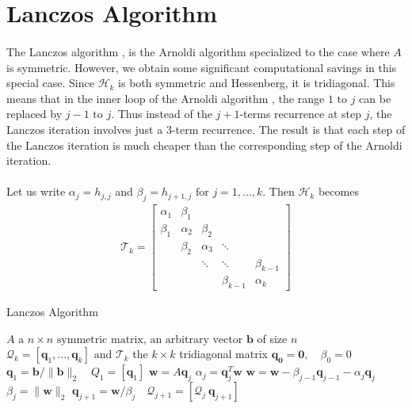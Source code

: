 \section{Lanczos Algorithm}
\paragraph*{}
The Lanczos algorithm \cite{Lanczos1950}, is the Arnoldi algorithm specialized to the case where $A$ is symmetric. However, we obtain some significant computational savings in this special case. Since $\mathcal{H}_k$ is both symmetric and Hessenberg, it is tridiagonal. This means that in the inner loop of the Arnoldi algorithm ,  the range $1 \text{ to } j$ can be replaced by $j-1 \text{ to } j$. Thus instead of the $j+1$-terms recurrence at step $j$, the Lanczos iteration involves just a $3$-term recurrence. The result is that each step of the Lanczos iteration is much cheaper than the corresponding step of the Arnoldi iteration.

\paragraph*{}
Let us write $\alpha_j=h_{j,j}$ and $\beta_j=h_{j+1,j} \text{ for } j=1,...,k$. Then $\mathcal{H}_k$ becomes
\begin{align*}
    \mathcal{T}_k = 
    \begin{bmatrix}
    \alpha_1    & \beta_1   &           &               &                \\
    \beta_1     & \alpha_2  & \beta_2   &               &                \\
                & \beta_2   & \alpha_3  & \ddots        &                \\
                &           & \ddots    & \ddots        & \beta_{k-1}   \\
                &           &           & \beta_{k-1}   & \alpha_{k}
  \end{bmatrix}
\end{align*} 

\begin{algorithm}
\caption{Lanczos Algorithm}\label{alg:lanczos}
\begin{algorithmic}[1]
\Require $A \text{ a } n\times n \text{ symmetric matrix, an arbitrary vector } \mathbf{b}$ of size $n$
\Ensure $ \mathcal{Q}_k=[\mathbf{q}_1,...,\mathbf{q}_k] \text{ and } \mathcal{T}_k$ the $k\times k$ tridiagonal matrix
\State $\mathbf{q_0} = \mathbf{0}, \quad \beta_0 = 0$
\State $\mathbf{q}_1 = \mathbf{b}/\lVert \mathbf{b} \rVert_2 \quad Q_1 = [\mathbf{q}_1]$
    \State $\mathbf{w} = A\mathbf{q}_j$
    \State $\alpha_j = \mathbf{q}_j^T \mathbf{w}$
    \State $\mathbf{w} = \mathbf{w} - \beta_{j-1}\mathbf{q}_{j-1}-\alpha_j\mathbf{q}_j$ 
    \State $\beta_j = \lVert \mathbf{w} \rVert_2$
    \State $\mathbf{q}_{j+1} = \mathbf{w}/\beta_j   \quad \mathcal{Q}_{j+1}=[\mathcal{Q}_j \ \mathbf{q}_{j+1}]$
\EndFor
\end{algorithmic}
\end{algorithm}

